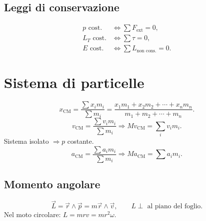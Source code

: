 \documentclass[a4paper,11pt]{article}
\newcommand{\orig}[1]{\clearpage}
\newcommand{\vv}[1]{\vec{#1}}
\begin{document}
\subsection*{Leggi di conservazione}
\[\begin{aligned}p\text{ cost.}&\Longleftrightarrow\sum F_{\mathrm{ext}}=0,\\
L_T\text{ cost.}&\Longleftrightarrow\sum\tau=0,\\
E\text{ cost.}&\Longleftrightarrow\sum L_{\text{non cons.}}=0.\end{aligned}\]
\orig{5}\section*{Sistema di particelle}
\[x_{\mathrm{CM}}=\frac{\sum x_im_i}{\sum m_i}=\frac{x_1m_1+x_2m_2+\cdots+x_nm_n}{m_1+m_2+\cdots+m_n}.\]
\[v_{\mathrm{CM}}=\frac{\sum v_im_i}{\sum m_i}\Rightarrow Mv_{\mathrm{CM}}=\sum_i v_im_i.\]
Sistema isolato $\Rightarrow p$ costante.
\[a_{\mathrm{CM}}=\frac{\sum a_im_i}{\sum m_i}\Rightarrow Ma_{\mathrm{CM}}=\sum a_im_i.\]
\subsection*{Momento angolare}
\[\vv L=\vv r\wedge\vv p=m\vv r\wedge\vv v,\qquad L\perp\text{ al piano del foglio}.\]
Nel moto circolare: $L=mrv=mr^2\omega$.
\end{document}
